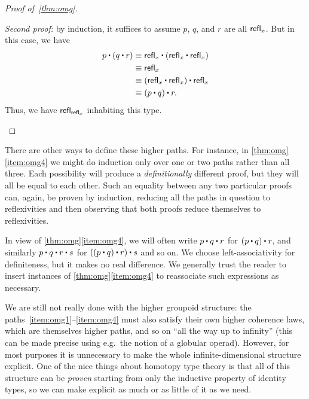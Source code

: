 \begin{proof}[Proof of~\cref{thm:omg}]
\begin{enumerate}
    \mentalpause

    \noindent \emph{Second proof:} by induction, it suffices to assume $p$, $q$, and $r$ are all $\mathsf{refl}_{x}$.
    But in this case, we have
    \begin{align*}
      p\ct (q\ct r)
      &\jdeq \refl{x}\ct(\refl{x}\ct \refl{x})\\
      &\jdeq \refl{x}\\
      &\jdeq (\refl{x}\ct \refl x)\ct \refl x\\
      &\jdeq (p\ct q)\ct r.
    \end{align*}
    Thus, we have $\mathsf{refl}_{\mathsf{refl}_{x}}$ inhabiting this type. \qedhere
  \end{enumerate}
\end{proof}

\begin{rmk}
  There are other ways to define these higher paths.
  For instance, in \cref{thm:omg}\ref{item:omg4} we might do induction only over one or two paths rather than all three.
  Each possibility will produce a \emph{definitionally} different proof, but they will all be equal to each other.
  Such an equality between any two particular proofs can, again, be proven by induction, reducing all the paths in question to reflexivities and then observing that both proofs reduce themselves to reflexivities.
\end{rmk}

In view of \cref{thm:omg}\ref{item:omg4}, we will often write $p\ct q\ct r$ for $(p\ct q)\ct r$, and similarly $p\ct q\ct r \ct s$ for $((p\ct q)\ct r)\ct s$ and so on.
We choose left-associativity for definiteness, but it makes no real difference.
We generally trust the reader to insert instances of \cref{thm:omg}\ref{item:omg4} to reassociate such expressions as necessary.

We are still not really done with the higher groupoid structure: the paths~\ref{item:omg1}--\ref{item:omg4} must also satisfy their own higher coherence laws, which are themselves higher paths,
%
%
%
%
and so on ``all the way up to infinity'' (this can be made precise using e.g.\ the notion of a globular operad).
However, for most purposes it is unnecessary to make the whole infinite-dimensional structure explicit.
One of the nice things about homotopy type theory is that all of this structure can be \emph{proven} starting from only the inductive property of identity types, so we can make explicit as much or as little of it as we need.

